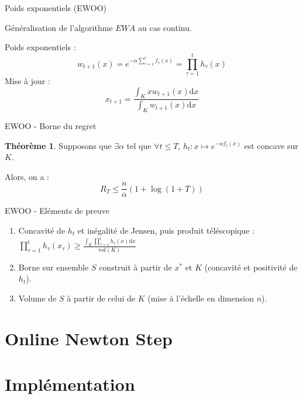 \documentclass[aspectratio=1610,17pt,utf8]{beamer}
\newcommand{\deriv}{\mathrm{d}}
\theoremstyle{definition}
\newtheorem*{theo}{Théorème}
\begin{document}
\begin{frame}{Poids exponentiels (EWOO)}

Généralisation de l'algorithme $EWA$ au cas continu.

Poids exponentiels :
\[
w_{t+1}(x) = e^{-\alpha\sum\limits_{\tau = 1}^{t} f_{\tau}(x)} = \prod\limits_{\tau = 1}^{t} h_{\tau}(x)
\]
Mise à jour :
\[
x_{t+1} = \frac{\int_K x w_{t+1}(x)\deriv x}{\int_K w_{t+1}(x)\deriv x}
\]
    
\end{frame}

\begin{frame}{EWOO - Borne du regret}

\begin{theo}
Supposons que $\exists \alpha$ tel que $\forall t\leq T$, $h_t : x \mapsto e^{-\alpha f_t(x)}$ est concave sur $K$.

Alors, on a :
\[
R_T \leq \frac{n}{\alpha}(1 + \log(1 + T))
\]
\end{theo}

\end{frame}

\begin{frame}{EWOO - Eléments de preuve}

\begin{enumerate}
    \item Concavité de $h_t$ et inégalité de Jensen, puis produit téléscopique : $\prod\limits_{\tau = 1}^t h_{\tau}(x_{\tau}) \geq \frac{\int_K \prod\limits_{\tau = 1}^t h_{\tau}(x) \deriv x}{\text{vol}(K)}$
    \item Borne sur ensemble $S$ construit à partir de $x^*$ et $K$ (concavité et positivité de $h_t$).
    \item Volume de $S$ à partir de celui de $K$ (mise à l'échelle en dimension $n$).
\end{enumerate}

\end{frame}

\section{\og Online Newton Step\fg}

\section{Implémentation}
\end{document}
